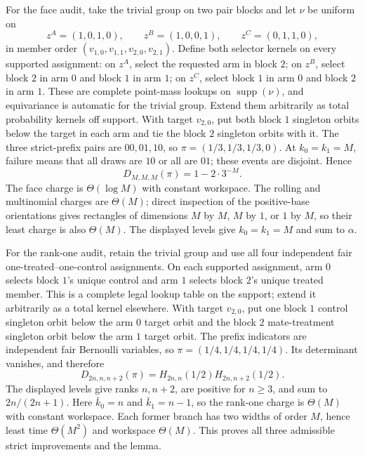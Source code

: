 For the face audit, take the trivial group on two pair blocks and let \(\nu\) be uniform on
\[
z^A=(1,0,1,0),\qquad z^B=(1,0,0,1),\qquad z^C=(0,1,1,0),
\tag{8}
\]
in member order \((v_{1,0},v_{1,1},v_{2,0},v_{2,1})\). Define both selector kernels on every supported assignment: on \(z^A\), select the requested arm in block \(2\); on \(z^B\), select block \(2\) in arm \(0\) and block \(1\) in arm \(1\); on \(z^C\), select block \(1\) in arm \(0\) and block \(2\) in arm \(1\). These are complete point-mass lookups on \(\operatorname{supp}(\nu)\), and equivariance is automatic for the trivial group. Extend them arbitrarily as total probability kernels off support. With target \(v_{2,0}\), put both block \(1\) singleton orbits below the target in each arm and tie the block \(2\) singleton orbits with it. The three strict-prefix pairs are \(00,01,10\), so \(\pi=(1/3,1/3,1/3,0)\). At \(k_0=k_1=M\), failure means that all draws are \(10\) or all are \(01\); these events are disjoint. Hence
\[
D_{M,M,M}(\pi)=1-2\cdot3^{-M}.
\]
The face charge is \(\Theta(\log M)\) with constant workspace. The rolling and multinomial charges are \(\Theta(M)\); direct inspection of the positive-base orientations gives rectangles of dimensions \(M\) by \(M\), \(M\) by \(1\), or \(1\) by \(M\), so their least charge is also \(\Theta(M)\). The displayed levels give \(k_0=k_1=M\) and sum to \(\alpha\).

For the rank-one audit, retain the trivial group and use all four independent fair one-treated--one-control assignments. On each supported assignment, arm \(0\) selects block \(1\)'s unique control and arm \(1\) selects block \(2\)'s unique treated member. This is a complete legal lookup table on the support; extend it arbitrarily as a total kernel elsewhere. With target \(v_{2,0}\), put one block \(1\) control singleton orbit below the arm \(0\) target orbit and the block \(2\) mate-treatment singleton orbit below the arm \(1\) target orbit. The prefix indicators are independent fair Bernoulli variables, so \(\pi=(1/4,1/4,1/4,1/4)\). Its determinant vanishes, and therefore
\[
D_{2n,n,n+2}(\pi)=H_{2n,n}(1/2)H_{2n,n+2}(1/2).
\]
The displayed levels give ranks \(n,n+2\), are positive for \(n\ge3\), and sum to \(2n/(2n+1)\). Here \(\bar k_0=n\) and \(\bar k_1=n-1\), so the rank-one charge is \(\Theta(M)\) with constant workspace. Each former branch has two widths of order \(M\), hence least time \(\Theta(M^2)\) and workspace \(\Theta(M)\). This proves all three admissible strict improvements and the lemma.